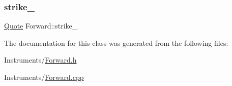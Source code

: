 \hypertarget{class_forward_a17c32d0a673c13fd92288b1720a43b76}{}\label{class_forward_a17c32d0a673c13fd92288b1720a43b76} 
\subsubsection{\texorpdfstring{strike\+\_\+}{strike\_}}
{\footnotesize\ttfamily \hyperlink{_name_def_8h_a642a6c5fd87319d922637de0e0bb0305}{Quote} Forward\+::strike\+\_\+\hspace{0.3cm}{\ttfamily [private]}}



The documentation for this class was generated from the following files\+:\begin{DoxyCompactItemize}
\item 
Instruments/\hyperlink{_forward_8h}{Forward.\+h}\item 
Instruments/\hyperlink{_forward_8cpp}{Forward.\+cpp}\end{DoxyCompactItemize}
